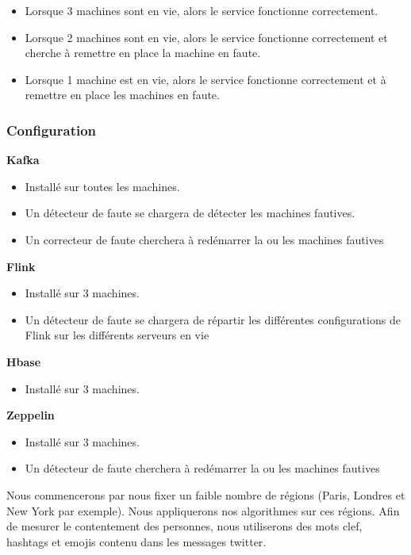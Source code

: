 \documentclass[a4paper,oneside,10pt]{article}
\begin{document}
\begin{itemize}
	\item Lorsque 3 machines sont en vie, alors le service fonctionne correctement.
	\item Lorsque 2 machines sont en vie, alors le service fonctionne correctement et cherche à remettre en place la machine en faute.
	\item Lorsque 1 machine est en vie, alors le service fonctionne correctement et à remettre en place les machines en faute. 
\end{itemize}

\subsubsection{Configuration}

\textbf{Kafka}
\begin{itemize}
	\item Installé sur toutes les machines. 
	\item Un détecteur de faute se chargera de détecter les machines fautives.
	\item Un correcteur de faute cherchera à redémarrer la ou les machines fautives
\end{itemize}

\textbf{Flink}
\begin{itemize}
	\item Installé sur 3 machines. 
	\item Un détecteur de faute se chargera de répartir les différentes configurations de Flink sur les différents serveurs en vie
\end{itemize}

\textbf{Hbase}
\begin{itemize}
	\item Installé sur 3 machines. 
\end{itemize}
	
\textbf{Zeppelin}
\begin{itemize}
	\item Installé sur 3 machines. 
	\item Un détecteur de faute cherchera à redémarrer la ou les machines fautives 
\end{itemize}

Nous commencerons par nous fixer un faible nombre de régions (Paris, Londres et New York par exemple). Nous appliquerons nos algorithmes sur ces régions. 
Afin de mesurer le contentement des personnes, nous utiliserons des mots clef, hashtags et emojis contenu dans les messages twitter. 
\end{document}
